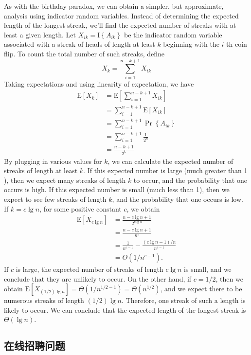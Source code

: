 \documentclass[lang=cn,newtx,10pt,scheme=chinese]{elegantbook}
\begin{document}
As with the birthday paradox, we can obtain a simpler, but approximate, analysis using indicator random variables. Instead of determining the expected length of the longest streak, we'll find the expected number of streaks with at least a given length. Let $X_{i k}=\mathrm{I}\left\{A_{i k}\right\}$ be the indicator random variable associated with a streak of heads of length at least $k$ beginning with the $i$ th coin flip. To count the total number of such streaks, define
$$
X_k=\sum_{i=1}^{n-k+1} X_{i k}
$$
Taking expectations and using linearity of expectation, we have
$$
\begin{aligned}
\mathrm{E}\left[X_k\right] & =\mathrm{E}\left[\sum_{i=1}^{n-k+1} X_{i k}\right] \\
& =\sum_{i=1}^{n-k+1} \mathrm{E}\left[X_{i k}\right] \\
& =\sum_{i=1}^{n-k+1} \operatorname{Pr}\left\{A_{i k}\right\} \\
& =\sum_{i=1}^{n-k+1} \frac{1}{2^k} \\
& =\frac{n-k+1}{2^k}
\end{aligned}
$$
By plugging in various values for $k$, we can calculate the expected number of streaks of length at least $k$. If this expected number is large (much greater than 1 ), then we expect many streaks of length $k$ to occur, and the probability that one occurs is high. If this expected number is small (much less than 1), then we expect to see few streaks of length $k$, and the probability that one occurs is low. If $k=c \lg n$, for some positive constant $c$, we obtain
$$
\begin{aligned}
\mathrm{E}\left[X_{c \lg n}\right] & =\frac{n-c \lg n+1}{2^{c \lg n}} \\
& =\frac{n-c \lg n+1}{n^c} \\
& =\frac{1}{n^{c-1}}-\frac{(c \lg n-1) / n}{n^{c-1}} \\
& =\Theta\left(1 / n^{c-1}\right) .
\end{aligned}
$$
If $c$ is large, the expected number of streaks of length $c \lg n$ is small, and we conclude that they are unlikely to occur. On the other hand, if $c=1 / 2$, then we obtain $\mathrm{E}\left[X_{(1 / 2) \lg n}\right]=\Theta\left(1 / n^{1 / 2-1}\right)=\Theta\left(n^{1 / 2}\right)$, and we expect there to be numerous streaks of length $(1 / 2) \lg n$. Therefore, one streak of such a length is likely to occur. We can conclude that the expected length of the longest streak is $\Theta(\lg n)$.

\subsection{在线招聘问题}
\end{document}
